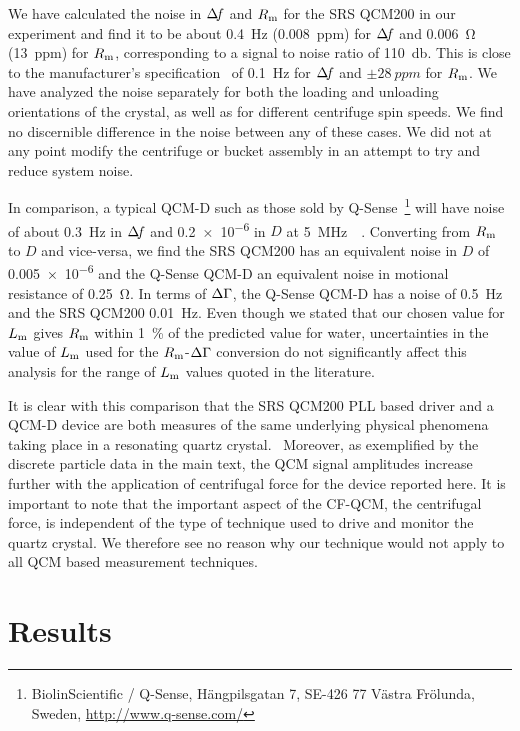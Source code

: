 We have calculated the noise in $\Delta\!f$ and $R_\mathrm{m}$ for the SRS QCM200 in our
experiment and find it to be about \SI{0.4}{\hertz} (\SI{0.008}{ppm}) for
$\Delta\!f$ and \SI{0.006}{\ohm} (\SI{13}{ppm}) for $R_\mathrm{m}$, corresponding to a
signal to noise ratio of \SI{110}{\decibel}.  This is close to the
manufacturer's specification~\cite{srsqcm200manual} of \SI{0.1}{\hertz} for
$\Delta\!f$ and $\pm\SI{28}{ppm}$ for $R_\mathrm{m}$.  We have analyzed the noise
separately for both the loading and unloading orientations of the crystal,
as well as for different centrifuge spin speeds.  We find no discernible
difference in the noise between any of these cases.  We did not at any
point modify the centrifuge or bucket assembly in an attempt to try and
reduce system noise.

In comparison, a typical QCM-D such as those sold by
Q-Sense~\footnote{BiolinScientific / Q-Sense, Hängpilsgatan 7, SE-426 77
Västra Frölunda, Sweden,  \url{http://www.q-sense.com/}} will have noise of
about \SI{0.3}{\hertz} in $\Delta\!f$ and \num{0.2e-6} in $D$ at
\SI{5}{\mega\hertz}~\cite{su2005comparison}~\cite{peh2007understanding}.
Converting from $R_\mathrm{m}$ to $D$ and vice-versa, we find the SRS QCM200 has an
equivalent noise in $D$ of \num{0.005e-6} and the Q-Sense QCM-D an
equivalent noise in motional resistance of \SI{0.25}{\ohm}.  In terms of
$\Delta\Gamma$, the Q-Sense QCM-D has a noise of \SI{0.5}{\hertz} and the SRS QCM200
\SI{0.01}{\hertz}.  Even though we stated that our chosen value for $L_\mathrm{m}$
gives $R_\mathrm{m}$ within \SI{1}{\percent} of the predicted value for water,
uncertainties in the value of $L_\mathrm{m}$ used for the $R_\mathrm{m}$-$\Delta\Gamma$ conversion do
not significantly affect this analysis for the range of $L_\mathrm{m}$ values quoted
in the literature.

It is clear with this comparison that the SRS QCM200 PLL based driver and a
QCM-D device are both measures of the same underlying physical phenomena
taking place in a resonating quartz crystal.~\cite{geelhood2002transient}
Moreover, as exemplified by the discrete particle data in the main text,
the QCM signal amplitudes increase further with the application of
centrifugal force for the device reported here.  It is important to note
that the important aspect of the CF-QCM, the centrifugal force, is
independent of the type of technique used to drive and monitor the quartz
crystal.  We therefore see no reason why our technique would not apply to
all QCM based measurement techniques.  


\section*{Results}
\label{sec:experiment}
